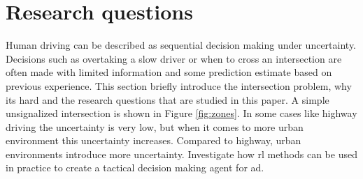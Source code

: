  
 







\section{Research questions}
\label{sec:research_questions}
Human driving can be described as sequential decision making under uncertainty. Decisions such as overtaking a slow driver or when to cross an intersection are often made with limited information and some prediction estimate based on previous experience. 
This section briefly introduce the intersection problem, why its hard and the research questions that are studied in this paper. 
A simple unsignalized intersection is shown in Figure \ref{fig:zones}.
In some cases like highway driving the uncertainty is very low, but when it comes to more urban environment this uncertainty increases. Compared to highway, urban environments introduce more uncertainty. 
Investigate how \gls{rl} methods can be used in practice to create a tactical decision making agent for \gls{ad}.


